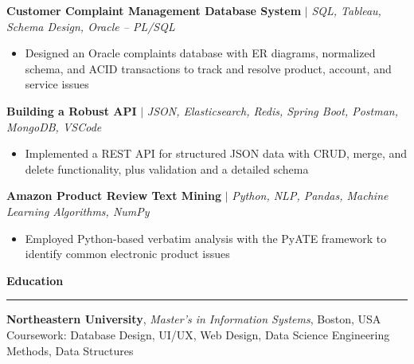 \documentclass[letterpaper,10pt]{article}
\newcommand{\resumesection}[1]{%
  \vspace{2pt}%
  {\large\bfseries\color{headblue}#1}\par%
  \vspace{1pt}%
  \noindent\rule{\textwidth}{0.6pt}\par%
  \vspace{1pt}%
}
\newcommand{\projheading}[2]{%
  \textbf{#1} $|$ \textit{#2}\par\vspace{1pt}%
}
\newenvironment{bullets}{%
  \begin{itemize}[leftmargin=0.2in,label=$\bullet$,topsep=1pt,itemsep=1pt,parsep=0pt]%
}{%
  \end{itemize}\vspace{1pt}%
}
\begin{document}
\projheading{Customer Complaint Management Database System}{SQL, Tableau, Schema Design, Oracle -- PL/SQL}
\begin{bullets}
\item Designed an Oracle complaints database with ER diagrams, normalized schema, and ACID transactions to track and resolve product, account, and service issues
\end{bullets}

\projheading{Building a Robust API}{JSON, Elasticsearch, Redis, Spring Boot, Postman, MongoDB, VSCode}
\begin{bullets}
\item Implemented a REST API for structured JSON data with CRUD, merge, and delete functionality, plus validation and a detailed schema
\end{bullets}

\projheading{Amazon Product Review Text Mining}{Python, NLP, Pandas, Machine Learning Algorithms, NumPy}
\begin{bullets}
\item Employed Python-based verbatim analysis with the PyATE framework to identify common electronic product issues
\end{bullets}

\resumesection{Education}
\textbf{Northeastern University}, \textit{Master's in Information Systems}, Boston, USA\\
Coursework: Database Design, UI/UX, Web Design, Data Science Engineering Methods, Data Structures
\end{document}
